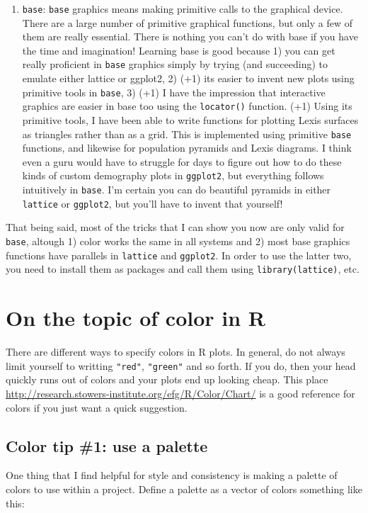 \documentclass[a4paper]{article}
\begin{document}
\begin{enumerate}
\item{\texttt{base}}: \texttt{base} graphics means making primitive calls to the graphical device. There are a large number of primitive graphical functions, but only a few of them are really essential. There is nothing you can't do with base if you have the time and imagination! Learning base is good because 1) you can get really proficient in \texttt{base} graphics simply by trying (and succeeding) to emulate either lattice or ggplot2, 2) (+1) its easier to invent new plots using primitive tools in \texttt{base}, 3) (+1) I have the impression that interactive graphics are easier in base too using the \texttt{locator()} function. (+1) Using its primitive tools, I have been able to write functions for plotting Lexis surfaces as triangles rather than as a grid. This is implemented using primitive \texttt{base} functions, and likewise for population pyramids and Lexis diagrams. I think even a guru would have to struggle for days to figure out how to do these kinds of custom demography plots in \texttt{ggplot2}, but everything follows intuitively in \texttt{base}. I'm certain you can do beautiful pyramids in either \texttt{lattice} or \texttt{ggplot2}, but you'll have to invent that yourself!
\end{enumerate}

That being said, most of the tricks that I can show you now are only valid for \texttt{base}, altough 1) color works the same in all systems and 2) most base graphics functions have parallels in \texttt{lattice} and \texttt{ggplot2}. In order to use the latter two, you need to install them as packages and call them using \texttt{library(lattice)}, etc.
\pagebreak
\section{On the topic of color in R}
There are different ways to specify colors in R plots. In general, do not always limit yourself to writting \texttt{"red"}, \texttt{"green"} and so forth. If you do, then your head quickly runs out of colors and your plots end up looking cheap. This place \url{http://research.stowers-institute.org/efg/R/Color/Chart/} is a good reference for colors if you just want a quick suggestion. 

\subsection{Color tip \#1: use a palette}
One thing that I find helpful for style and consistency is making a palette of colors to use within a project. Define a palette as a vector of colors something like this:
\end{document}
